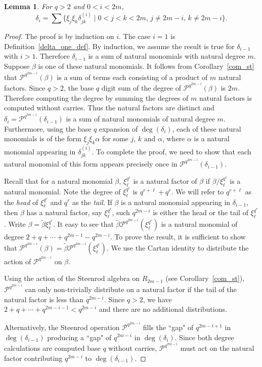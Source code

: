 \documentclass{amsart}
\newtheorem{lemma}[subsection]{Lemma}
\newcommand{\PP}{\mathcal{P}}
\begin{document}
\begin{lemma}\label{delta_gen_lem}
    For $q>2$ and $0<i<2m$,
    $$\delta_i=\sum\{\xi_j\xi_k\delta_{jk}^{(i)}\mid 
    0<j<k<2m,\, j\not=2m-i,\, k\not=2m-i\}.$$
\end{lemma}
\begin{proof} 
 The proof is by induction on $i$.
The case $i=1$ is Definition~\ref{delta_one_def}. 
By induction, we assume the result is true for $\delta_{i-1}$ with $i>1$.
Therefore $\delta_{i-1}$ is a sum of natural monomials with natural degree $m$. Suppose $\beta$ is one of these natural monomials.
It follows from Corollary~\ref{com_st} that $\PP^{q^{2m-i}}(\beta)$ is a
sum of terms each consisting of a product of $m$ natural factors.
Since $q>2$, the base $q$ digit sum of the degree of $\PP^{q^{2m-i}}(\beta)$
is $2m$. Therefore computing the degree by summing the degrees of $m$ natural factors is computed without carries. Thus the natural factors are distinct and $\delta_i=\PP^{q^{2m-i}}(\delta_{i-1})$ is a sum of natural monomials of natural degree $m$. Furthermore, using the base $q$ expansion of $\deg(\delta_i)$, each of these natural monomials is of the form $\xi_j\xi_k\alpha$ for
some $j$, $k$ and $\alpha$, where $\alpha$ is a natural monomial appearing in $\delta_{jk}^{(i)}$. To complete the proof, we need to show that each natural monomial of this form appears precisely once in
$\PP^{q^{2m-i}}(\delta_{i-1})$. 

 Recall that for a natural monomial $\beta$,  $\xi_\ell^{q^r}$ is a natural factor of  $\beta$ if $\beta/\xi_\ell^{q^r}$ is a natural monomial.
Note the degree of $\xi_\ell^{q^r}$ is $q^{r+\ell}+q^r$. We will refer to $q^{r+\ell}$ as the {\it head} of $\xi_\ell^{q^r}$ and $q^r$ as the {\it tail}. 
If $\beta$ is a natural monomial appearing in 
$\delta_{i-1}$, then $\beta$ has a natural factor, say $\xi_\ell^{q^r}$, such $q^{2m-i}$ is either the head or the tail of $\xi_\ell^{q^r}$. Write $\beta=\widetilde{\beta}\xi_\ell^{q^r}$.
It easy to see that $\widetilde{\beta}\PP^{q^{2m-i}}(\xi_\ell^{q^r})$ is a natural monomial of degree $2+q+\cdots +q^{2m-1}-q^{2m-i}$.
To prove the result, it is sufficient to show that $\PP^{q^{2m-i}}(\beta)=\widetilde{\beta}\PP^{q^{2m-i}}(\xi_\ell^{q^r})$.
We use the Cartan identity to distribute the action of $\PP^{q^{2m-i}}$ on $\beta$. 

Using the action of the Steenrod algebra on $R_{2m-1}$
(see Corollary~\ref{com_st}), $\PP^{q^{2m-i}}$ can only non-trivially distribute on a natural factor
if the tail of the natural factor is less than $q^{2m-i}$.
Since $q>2$, we have $2+q+\cdots +q^{2m-i-1}<q^{2m-i}$ and there are no additional distributions.

Alternatively, 
the Steenrod operation $\PP^{q^{2m-i}}$ fills the ``gap" of $q^{2m-i+1}$ in $\deg(\delta_{i-1})$ producing a ``gap" of $q^{2m-i}$ in $\deg(\delta_i)$.
Since both degree calculations are computed base $q$ without carries,
$\PP^{q^{2m-i}}$ must act on the natural factor contributing $q^{2m-i}$
to $\deg(\delta_{i-1})$.
\end{proof}
\end{document}
